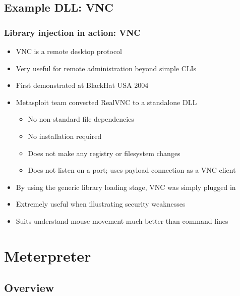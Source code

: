 \documentclass{beamer}
\newenvironment{sitemize}{\vspace{1mm}\begin{itemize}\itemsep 4pt\small}{\end{itemize}}
\begin{document}
\subsection{Example DLL: VNC}

\begin{frame}[t]
    \frametitle{Library injection in action: VNC}

    \begin{sitemize}
        \item VNC is a remote desktop protocol
        \item Very useful for remote administration beyond simple CLIs
    \end{sitemize}

    \pause
    \begin{sitemize}
        \item First demonstrated at BlackHat USA 2004

        \pause
        \item Metasploit team converted RealVNC to a standalone DLL
        \begin{sitemize}
            \item No non-standard file dependencies
            \item No installation required
            \item Does not make any registry or filesystem changes
            \item Does not listen on a port; uses payload connection as a VNC client
        \end{sitemize}

        \pause
        \item By using the generic library loading stage, VNC was simply plugged in
    \end{sitemize}

    \pause
    \begin{sitemize}
        \item Extremely useful when illustrating security weaknesses
        \item Suits understand mouse movement much better than command lines
    \end{sitemize}
\end{frame}

\section{Meterpreter}

\subsection{Overview}
\end{document}
